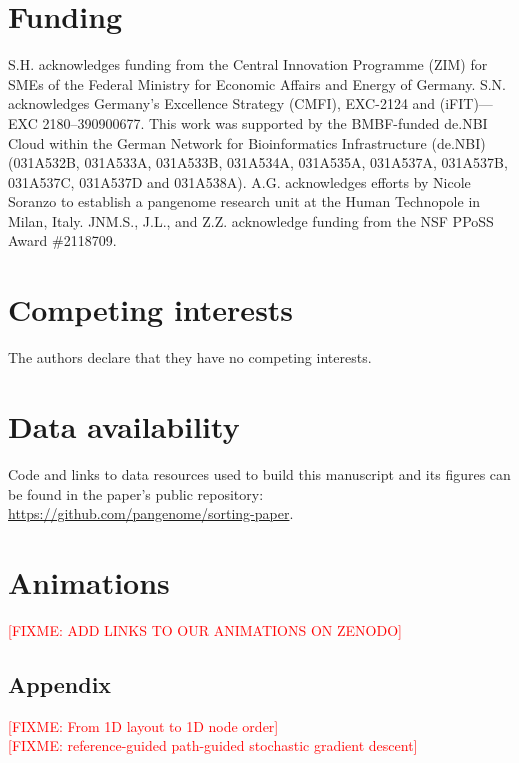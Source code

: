 \documentclass{bioinfo}
\theoremstyle{definition}
\newcommand{\red}[1]{{\textcolor{Red}{#1}}}
\newcommand{\FIXME}[1]{\red{[FIXME: #1]}}
\begin{document}
	\section*{Funding}
	
	S.H. acknowledges funding from the Central Innovation Programme (ZIM) for SMEs of the Federal Ministry for Economic Affairs and Energy of Germany.
	S.N. acknowledges Germany’s Excellence Strategy (CMFI), EXC-2124 and (iFIT)—EXC 2180–390900677.
	This work was supported by the BMBF-funded de.NBI Cloud within the German Network for Bioinformatics Infrastructure (de.NBI) (031A532B, 031A533A, 031A533B, 031A534A, 031A535A, 031A537A, 031A537B, 031A537C, 031A537D and 031A538A).
	A.G. acknowledges efforts by Nicole Soranzo to establish a pangenome research unit at the Human Technopole in Milan, Italy.
	JNM.S., J.L., and Z.Z. acknowledge funding from the NSF PPoSS Award \#2118709.
	
	\section*{Competing interests}
	The authors declare that they have no competing interests.
	
	\section*{Data availability}
	
	Code and links to data resources used to build this manuscript and its figures can be found in the paper's public repository: \url{https://github.com/pangenome/sorting-paper}.
	
	\section{Animations}
	\FIXME{ADD LINKS TO OUR ANIMATIONS ON ZENODO}
	
	
	
	
	
	\begin{appendices}
	    \section{Appendix}
	    \FIXME{From 1D layout to 1D node order} \\
	    \FIXME{reference-guided path-guided stochastic gradient descent}
	\end{appendices}
\end{document}
